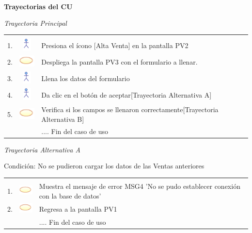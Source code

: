 \documentclass[10pt,spanish]{article}
\providecommand{\tabularnewline}{\\}
\begin{document}


\textbf{\large Trayectorias del CU}{\large \par}

\textit{\large Trayectoria Principal}{\large {} }{\large \par}


\begin{tabular}{ccl}
 &  & \tabularnewline
1.  & \includegraphics{actor}  & \multicolumn{1}{p{12cm}}{ Presiona el ícono {[}Alta Venta{]} en la pantalla PV2}\tabularnewline
2.  & \includegraphics{sistema}  & \multicolumn{1}{p{12cm}}{Despliega la pantalla PV3 con el formulario a llenar.}\tabularnewline
3.  & \includegraphics{actor}  & \multicolumn{1}{p{12cm}}{Llena los datos del formulario}\tabularnewline
4.  & \includegraphics{actor}  & \multicolumn{1}{p{12cm}}{Da clic en el botón de aceptar{[}Trayectoria Alternativa A{]}}\tabularnewline
5.  & \includegraphics{sistema}  & \multicolumn{1}{p{12cm}}{Verifica si los campos se llenaron correctamente{[}Trayectoria Alternativa B{]}}\tabularnewline
 &  & \multicolumn{1}{p{12cm}}{.... Fin del caso de uso}\tabularnewline
\end{tabular}

\textit{Trayectoria Alternativa A}

Condición: No se pudieron cargar los datos de las Ventas anteriores

\begin{tabular}{ccl}
 &  & \tabularnewline
1.  & \includegraphics{sistema}  & \multicolumn{1}{p{12cm}}{ Muestra el mensaje de error MSG4 'No se pudo establecer conexión
con la base de datos'}\tabularnewline
2.  & \includegraphics{sistema}  & \multicolumn{1}{p{12cm}}{Regresa a la pantalla PV1}\tabularnewline
 &  & \multicolumn{1}{p{12cm}}{.... Fin del caso de uso}\tabularnewline
\end{tabular}



\end{document}
